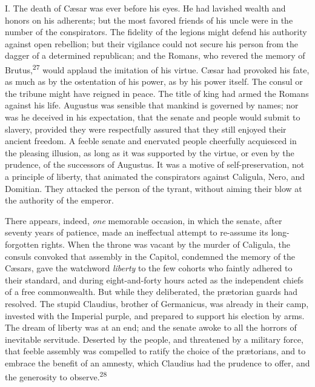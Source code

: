 I. The death of Cæsar was ever before his eyes. He had lavished
wealth and honors on his adherents; but the most favored friends
of his uncle were in the number of the conspirators. The fidelity
of the legions might defend his authority against open rebellion;
but their vigilance could not secure his person from the dagger
of a determined republican; and the Romans, who revered the
memory of Brutus,\textsuperscript{27} would applaud the imitation of his virtue.
Cæsar had provoked his fate, as much as by the ostentation of his
power, as by his power itself. The consul or the tribune might
have reigned in peace. The title of king had armed the Romans
against his life. Augustus was sensible that mankind is governed
by names; nor was he deceived in his expectation, that the senate
and people would submit to slavery, provided they were
respectfully assured that they still enjoyed their ancient
freedom. A feeble senate and enervated people cheerfully
acquiesced in the pleasing illusion, as long as it was supported
by the virtue, or even by the prudence, of the successors of
Augustus. It was a motive of self-preservation, not a principle
of liberty, that animated the conspirators against Caligula,
Nero, and Domitian. They attacked the person of the tyrant,
without aiming their blow at the authority of the emperor.


There appears, indeed, \textit{one} memorable occasion, in which the
senate, after seventy years of patience, made an ineffectual
attempt to re-assume its long-forgotten rights. When the throne
was vacant by the murder of Caligula, the consuls convoked that
assembly in the Capitol, condemned the memory of the Cæsars, gave
the watchword \textit{liberty} to the few cohorts who faintly adhered to
their standard, and during eight-and-forty hours acted as the
independent chiefs of a free commonwealth. But while they
deliberated, the prætorian guards had resolved. The stupid
Claudius, brother of Germanicus, was already in their camp,
invested with the Imperial purple, and prepared to support his
election by arms. The dream of liberty was at an end; and the
senate awoke to all the horrors of inevitable servitude. Deserted
by the people, and threatened by a military force, that feeble
assembly was compelled to ratify the choice of the prætorians,
and to embrace the benefit of an amnesty, which Claudius had the
prudence to offer, and the generosity to observe.\textsuperscript{28}

